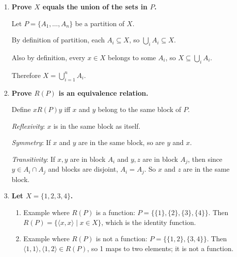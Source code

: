 \begin{enumerate}[{0.}1. ]
Let $[x]_R = \{y \in X \mid y R x\}$.

\textit{Coverage}: For any $x \in X$, reflexivity gives $x \in [x]_R$, so every element of $X$ belongs to at least one class.

\textit{Disjointness}: Suppose $[x]_R \cap [y]_R \neq \emptyset$; pick $z$ with $z R x$ and $z R y$. By symmetry $x R z$, and by transitivity $x R y$. For any $w \in [x]_R$ we have $w R x R y$, so $w \in [y]_R$; thus $[x]_R \subseteq [y]_R$. By symmetry $[y]_R \subseteq [x]_R$, so $[x]_R = [y]_R$.

Hence the distinct classes are disjoint and cover $X$, forming a partition.

\item \textbf{Prove $X$ equals the union of the sets in $P$.}

Let $P = \{A_1,\ldots,A_n\}$ be a partition of $X$.

By definition of partition, each $A_i \subseteq X$, so $\bigcup_i A_i \subseteq X$.

Also by definition, every $x \in X$ belongs to some $A_i$, so $X \subseteq \bigcup_i A_i$.

Therefore $X = \bigcup_{i=1}^n A_i$.

\item \textbf{Prove $R(P)$ is an equivalence relation.}

Define $x R(P) y$ iff $x$ and $y$ belong to the same block of $P$.

\textit{Reflexivity}: $x$ is in the same block as itself.

\textit{Symmetry}: If $x$ and $y$ are in the same block, so are $y$ and $x$.

\textit{Transitivity}: If $x,y$ are in block $A_i$ and $y,z$ are in block $A_j$, then since $y \in A_i \cap A_j$ and blocks are disjoint, $A_i = A_j$. So $x$ and $z$ are in the same block.

\item \textbf{Let $X = \{1,2,3,4\}$.}

\begin{enumerate}
\item Example where $R(P)$ is a function: $P = \{\{1\},\{2\},\{3\},\{4\}\}$. Then $R(P) = \{\langle x,x\rangle \mid x \in X\}$, which is the identity function.

\item Example where $R(P)$ is not a function: $P = \{\{1,2\},\{3,4\}\}$. Then $\langle 1,1\rangle,\langle 1,2\rangle \in R(P)$, so 1 maps to two elements; it is not a function.
\end{enumerate}


\end{enumerate}
